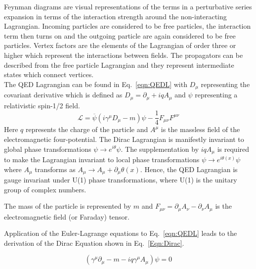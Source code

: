 Feynman diagrams are visual representations of the terms in a perturbative series expansion in terms of the interaction strength around the non-interacting Lagrangian. Incoming particles are considered to be free particles, the interaction term then turns on and the outgoing particle are again considered to be free particles. Vertex factors are the elements of the Lagrangian of order three or higher which represent the interactions between fields. The propagators can be described from the free particle Lagrangian and they represent intermediate states which connect vertices.\\

The QED Lagrangian can be found in Eq.~\ref{eqn:QEDL} with $D_{\mu}$ representing the covariant derivative which is defined as $D_{\mu} = \partial_{\mu} + iqA_{\mu}$ and $\psi$ representing a relativistic spin-1/2 field. 
\begin{equation}
\mathcal{L} = \overline{\psi}\left(i\gamma^{\mu}D_{\mu}-m\right)\psi - \frac{1}{4}F_{\mu\nu}F^{\mu\nu}
\label{eqn:QEDL}
\end{equation}
Here $q$ represents the charge of the particle and $A^{\mu}$ is the massless field of the electromagnetic four-potential. The Dirac Lagrangian is manifestly invariant to global phase transformations $\psi \rightarrow e^{i\theta} \psi$. The supplementation by $iqA_{\mu}$ is required to make the Lagrangian invariant to local phase transformations $\psi \rightarrow e^{i\theta(x)} \psi$ where $A_{\mu}$ transforms as $A_{\mu} \rightarrow A_{\mu} + \partial_{\mu}\theta(x)$. Hence, the QED Lagrangian is gauge invariant under U(1) phase transformations, where U(1) is the unitary group of complex numbers. 

The mass of the particle is represented by $m$ and $F_{\mu\nu} = \partial_{\mu}A_{\nu} - \partial_{\nu}A_{\mu}$ is the electromagnetic field (or Faraday) tensor.

Application of the Euler-Lagrange equations to Eq.~\ref{eqn:QEDL} leads to the derivation of the Dirac Equation shown in Eq.~\ref{Eqn:Dirac}.

\begin{equation}
\left( \gamma^{\mu }\partial _{\mu } -m - iq\gamma^{\mu }A_{\mu}\right)\psi = 0
\label{Eqn:Dirac}
\end{equation}

